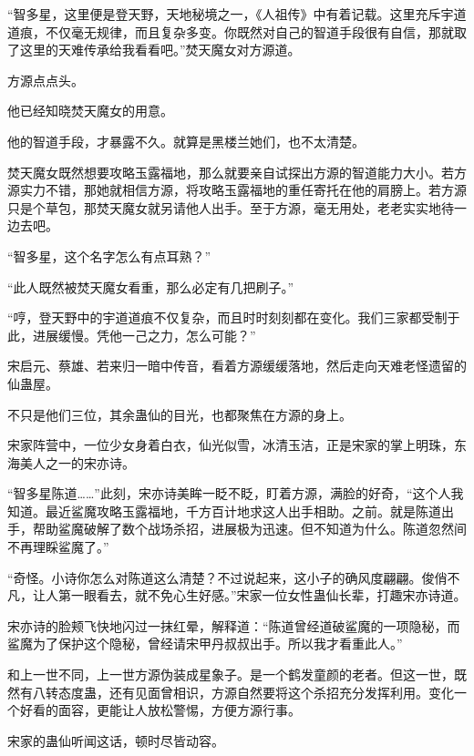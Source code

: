 
\begin{this_body}



“智多星，这里便是登天野，天地秘境之一，《人祖传》中有着记载。这里充斥宇道道痕，不仅毫无规律，而且复杂多变。你既然对自己的智道手段很有自信，那就取了这里的天难传承给我看看吧。”焚天魔女对方源道。

方源点点头。

他已经知晓焚天魔女的用意。

他的智道手段，才暴露不久。就算是黑楼兰她们，也不太清楚。

焚天魔女既然想要攻略玉露福地，那么就要亲自试探出方源的智道能力大小。若方源实力不错，那她就相信方源，将攻略玉露福地的重任寄托在他的肩膀上。若方源只是个草包，那焚天魔女就另请他人出手。至于方源，毫无用处，老老实实地待一边去吧。

“智多星，这个名字怎么有点耳熟？”

“此人既然被焚天魔女看重，那么必定有几把刷子。”

“哼，登天野中的宇道道痕不仅复杂，而且时时刻刻都在变化。我们三家都受制于此，进展缓慢。凭他一己之力，怎么可能？”

宋启元、蔡雄、若来归一暗中传音，看着方源缓缓落地，然后走向天难老怪遗留的仙蛊屋。

不只是他们三位，其余蛊仙的目光，也都聚焦在方源的身上。

宋家阵营中，一位少女身着白衣，仙光似雪，冰清玉洁，正是宋家的掌上明珠，东海美人之一的宋亦诗。

“智多星陈道……”此刻，宋亦诗美眸一眨不眨，盯着方源，满脸的好奇，“这个人我知道。最近鲨魔攻略玉露福地，千方百计地求这人出手相助。之前。就是陈道出手，帮助鲨魔破解了数个战场杀招，进展极为迅速。但不知道为什么。陈道忽然间不再理睬鲨魔了。”

“奇怪。小诗你怎么对陈道这么清楚？不过说起来，这小子的确风度翩翩。俊俏不凡，让人第一眼看去，就不免心生好感。”宋家一位女性蛊仙长辈，打趣宋亦诗道。

宋亦诗的脸颊飞快地闪过一抹红晕，解释道：“陈道曾经道破鲨魔的一项隐秘，而鲨魔为了保护这个隐秘，曾经请宋甲丹叔叔出手。所以我才看重此人。”

和上一世不同，上一世方源伪装成星象子。是一个鹤发童颜的老者。但这一世，既然有八转态度蛊，还有见面曾相识，方源自然要将这个杀招充分发挥利用。变化一个好看的面容，更能让人放松警惕，方便方源行事。

宋家的蛊仙听闻这话，顿时尽皆动容。


\end{this_body}

